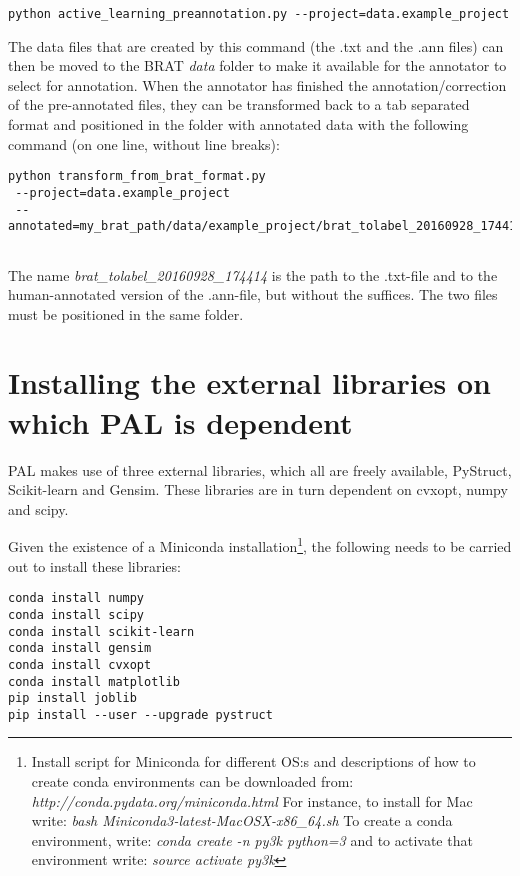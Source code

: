 \documentclass{report}
\begin{document}
{\footnotesize
\begin{verbatim}
python active_learning_preannotation.py --project=data.example_project

\end{verbatim}}

The data files that are created by this command (the .txt and the .ann files) can then be moved to the BRAT \emph{data} folder to make it available for the annotator to select for annotation. When the annotator has finished the annotation/correction of the pre-annotated files, they can be transformed back to a tab separated format and positioned in the folder with annotated data with the following command (on one line, without line breaks):

{\footnotesize
\begin{verbatim}
python transform_from_brat_format.py 
 --project=data.example_project
 --annotated=my_brat_path/data/example_project/brat_tolabel_20160928_174414
 
\end{verbatim}}

The name \emph{brat\_tolabel\_20160928\_174414} is the path to the .txt-file and to the human-annotated version of the .ann-file, but without the suffices. The two files must be positioned in the same folder.

\section*{Installing the external libraries on which PAL is dependent}
PAL makes use of three external libraries, which all are freely available, PyStruct, Scikit-learn and Gensim. These libraries are in turn dependent on cvxopt, numpy and scipy.

Given the existence of  a Miniconda installation\footnote{Install script for Miniconda for different OS:s and descriptions of how to create conda environments can be downloaded from: \newline \emph{http://conda.pydata.org/miniconda.html} \newline For instance, to install for Mac write: \newline \emph{bash Miniconda3-latest-MacOSX-x86\_64.sh} \newline To create a conda environment, write: \newline \emph{conda create -n py3k python=3}  \newline and to activate that environment write: \newline \emph{source activate py3k}}, the following needs to be carried out to install these libraries:

{\footnotesize \begin{verbatim}
conda install numpy
conda install scipy
conda install scikit-learn
conda install gensim
conda install cvxopt
conda install matplotlib
pip install joblib
pip install --user --upgrade pystruct
\end{verbatim}}
\end{document}
